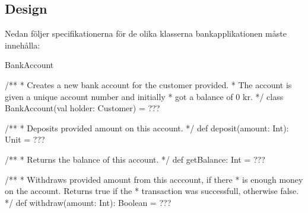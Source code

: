 \subsection{Design}
Nedan följer specifikationerna för de olika klasserna bankapplikationen måste innehålla:


\begin{ScalaSpec}{BankAccount}

/**
 * Creates a new bank account for the customer provided.
 * The account is given a unique account number and initially
 * got a balance of 0 kr.
 */
class BankAccount(val holder: Customer) = ???

 /**
   * Deposits provided amount on this account.
   */
  def deposit(amount: Int): Unit = ???

/**
   * Returns the balance of this account.
   */
  def getBalance: Int = ???

/**
   * Withdraws provided amount from this acccount, if there
   * is enough money on the account. Returns true if the 
   * transaction was successfull, otherwise false. 
   */
  def withdraw(amount: Int): Boolean = ???

\end{ScalaSpec}



